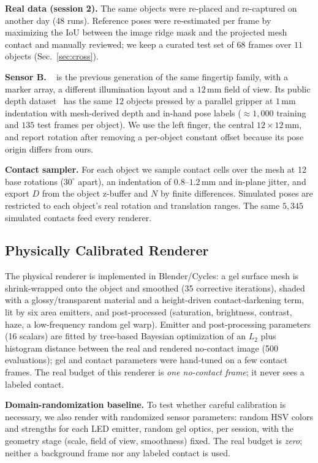 \noindent\textbf{Real data (session 2).} The same objects were re-placed and re-captured on another day (48 runs). Reference poses were re-estimated per frame by maximizing the IoU between the image ridge mask and the projected mesh contact and manually reviewed; we keep a curated test set of $68$ frames over $11$ objects (Sec.~\ref{sec:cross}).

\noindent\textbf{Sensor B.} \sensorB{}~\cite{sipos2024gelslim4} is the previous generation of the same fingertip family, with a marker array, a different illumination layout and a $12\,$mm field of view. Its public depth dataset~\cite{sipos2024gelslim4} has the same 12 objects pressed by a parallel gripper at $1\,$mm indentation with mesh-derived depth and in-hand pose labels ($\approx\!1{,}000$ training and $135$ test frames per object). We use the left finger, the central $12\times12\,$mm, and report rotation after removing a per-object constant offset because its pose origin differs from ours.

\noindent\textbf{Contact sampler.} For each object we sample contact cells over the mesh at 12 base rotations ($30^\circ$ apart), an indentation of $0.8$--$1.2\,$mm and in-plane jitter, and export $D$ from the object z-buffer and $N$ by finite differences. Simulated poses are restricted to each object's real rotation and translation ranges. The same $5{,}345$ simulated contacts feed every renderer.

\subsection{Physically Calibrated Renderer}
\label{sec:blender}
The physical renderer is implemented in Blender/Cycles: a gel surface mesh is shrink-wrapped onto the object and smoothed (35 corrective iterations), shaded with a glossy/transparent material and a height-driven contact-darkening term, lit by six area emitters, and post-processed (saturation, brightness, contrast, haze, a low-frequency random gel warp). Emitter and post-processing parameters (16 scalars) are fitted by tree-based Bayesian optimization of an $L_2$ plus histogram distance between the real and rendered no-contact image (500 evaluations); gel and contact parameters were hand-tuned on a few contact frames. The real budget of this renderer is \emph{one no-contact frame}; it never sees a labeled contact.

\noindent\textbf{Domain-randomization baseline.} To test whether careful calibration is necessary, we also render with randomized sensor parameters: random HSV colors and strengths for each LED emitter, random gel optics, per session, with the geometry stage (scale, field of view, smoothness) fixed. The real budget is \emph{zero}; neither a background frame nor any labeled contact is used.

